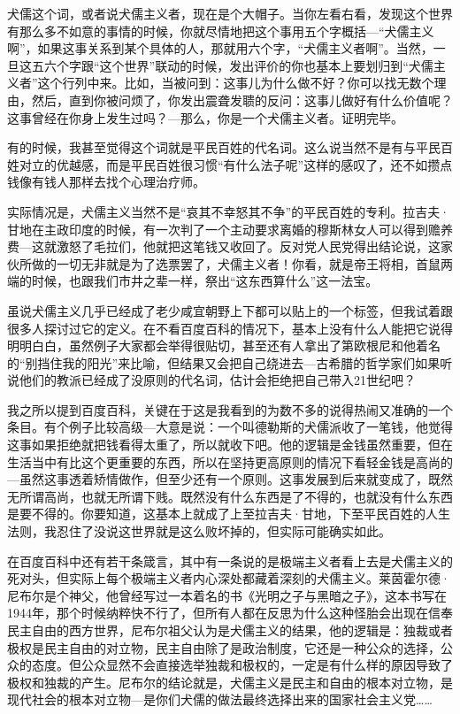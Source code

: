 犬儒这个词，或者说犬儒主义者，现在是个大帽子。当你左看右看，发现这个世界有那么多不如意的事情的时候，你就尽情地把这个事用五个字概括---``犬儒主义啊''，如果这事关系到某个具体的人，那就用六个字，``犬儒主义者啊''。当然，一旦这五六个字跟``这个世界''联动的时候，发出评价的你也基本上要划归到``犬儒主义者''这个行列中来。比如，当被问到：这事儿为什么做不好？你可以找无数个理由，然后，直到你被问烦了，你发出震聋发聩的反问：这事儿做好有什么价值呢？这事曾经在你身上发生过吗？---那么，你是一个犬儒主义者。证明完毕。

有的时候，我甚至觉得这个词就是平民百姓的代名词。这么说当然不是有与平民百姓对立的优越感，而是平民百姓很习惯``有什么法子呢''这样的感叹了，还不如攒点钱像有钱人那样去找个心理治疗师。

实际情况是，犬儒主义当然不是``哀其不幸怒其不争''的平民百姓的专利。拉吉夫·甘地在主政印度的时候，有一次判了一个主动要求离婚的穆斯林女人可以得到赡养费---这就激怒了毛拉们，他就把这笔钱又收回了。反对党人民党得出结论说，这家伙所做的一切无非就是为了选票罢了，犬儒主义者！你看，就是帝王将相，首鼠两端的时候，也跟我们市井之辈一样，祭出``这东西算什么''这一法宝。

虽说犬儒主义几乎已经成了老少咸宜朝野上下都可以贴上的一个标签，但我试着跟很多人探讨过它的定义。在不看百度百科的情况下，基本上没有什么人能把它说得明明白白，虽然例子大家都会举得很贴切，甚至还有人拿出了第欧根尼和他着名的``别挡住我的阳光''来比喻，但结果又会把自己绕进去---古希腊的哲学家们如果听说他们的教派已经成了没原则的代名词，估计会拒绝把自己带入21世纪吧？

我之所以提到百度百科，关键在于这是我看到的为数不多的说得热闹又准确的一个条目。有个例子比较高级---大意是说：一个叫德勒斯的犬儒派收了一笔钱，他觉得这事如果拒绝就把钱看得太重了，所以就收下吧。他的逻辑是金钱虽然重要，但在生活当中有比这个更重要的东西，所以在坚持更高原则的情况下看轻金钱是高尚的---虽然这事透着矫情做作，但至少还有一个原则。这事发展到后来就变成了，既然无所谓高尚，也就无所谓下贱。既然没有什么东西是了不得的，也就没有什么东西是要不得的。你要知道，这基本上就成了上至拉吉夫·甘地，下至平民百姓的人生法则，我忍住了没说这世界就是这么败坏掉的，但实际可能确实如此。

在百度百科中还有若干条箴言，其中有一条说的是极端主义者看上去是犬儒主义的死对头，但实际上每个极端主义者内心深处都藏着深刻的犬儒主义。莱茵霍尔德·尼布尔是个神父，他曾经写过一本着名的书《光明之子与黑暗之子》，这本书写在1944年，那个时候纳粹快不行了，但所有人都在反思为什么这种怪胎会出现在信奉民主自由的西方世界，尼布尔祖父认为是犬儒主义的结果，他的逻辑是：独裁或者极权是民主自由的对立物，民主自由除了是政治制度，它还是一种公众的选择，公众的态度。但公众显然不会直接选举独裁和极权的，一定是有什么样的原因导致了极权和独裁的产生。尼布尔的结论就是，犬儒主义是民主和自由的根本对立物，是现代社会的根本对立物---是你们犬儒的做法最终选择出来的国家社会主义党\ldots{}\ldots{}

